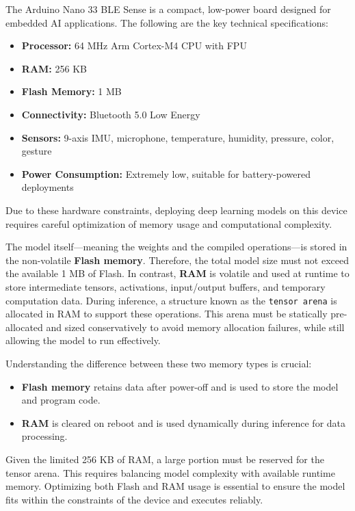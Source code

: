 The Arduino Nano 33 BLE Sense is a compact, low-power board designed for embedded AI applications. The following are the key technical specifications:

\begin{itemize}
\item \textbf{Processor:} 64 MHz Arm Cortex-M4 CPU with FPU
\item \textbf{RAM:} 256 KB
\item \textbf{Flash Memory:} 1 MB
\item \textbf{Connectivity:} Bluetooth 5.0 Low Energy
\item \textbf{Sensors:} 9-axis IMU, microphone, temperature, humidity, pressure, color, gesture
\item \textbf{Power Consumption:} Extremely low, suitable for battery-powered deployments
\end{itemize}

Due to these hardware constraints, deploying deep learning models on this device requires careful optimization of memory usage and computational complexity. 

The model itself—meaning the weights and the compiled operations—is stored in the non-volatile \textbf{Flash memory}. Therefore, the total model size must not exceed the available 1 MB of Flash. In contrast, \textbf{RAM} is volatile and used at runtime to store intermediate tensors, activations, input/output buffers, and temporary computation data. During inference, a structure known as the \texttt{tensor arena} is allocated in RAM to support these operations. This arena must be statically pre-allocated and sized conservatively to avoid memory allocation failures, while still allowing the model to run effectively.

Understanding the difference between these two memory types is crucial:
\begin{itemize}
\item \textbf{Flash memory} retains data after power-off and is used to store the model and program code.
\item \textbf{RAM} is cleared on reboot and is used dynamically during inference for data processing.
\end{itemize}

Given the limited 256 KB of RAM, a large portion must be reserved for the tensor arena. This requires balancing model complexity with available runtime memory. Optimizing both Flash and RAM usage is essential to ensure the model fits within the constraints of the device and executes reliably.


